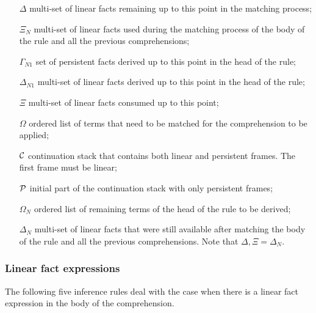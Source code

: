\begin{enumerate}

   \item[$\Delta$] multi-set of linear facts remaining up to this point in the
   matching process;

   \item[$\Xi_N$] multi-set of linear facts used during the matching process of
   the body of the rule and all the previous comprehensions;

   \item[$\Gamma_{N1}$] set of persistent facts derived up to this point in the
   head of the rule;

   \item[$\Delta_{N1}$] multi-set of linear facts derived up to this point in
   the head of the rule;

   \item[$\Xi$] multi-set of linear facts consumed up to this point;

   \item[$\Omega$] ordered list of terms that need to be matched for the
   comprehension to be applied;

   \item[$\mathcal{C}$] continuation stack that contains both linear and
   persistent frames. The first frame must be linear;

   \item[$\mathcal{P}$] initial part of the continuation stack with only persistent
   frames;

   \item[$\Omega_N$] ordered list of remaining terms of the head of the rule to
   be derived;

   \item[$\Delta_N$] multi-set of linear facts that were still available after
   matching the body of the rule and all the previous comprehensions. Note that
   $\Delta, \Xi = \Delta_N$.

\end{enumerate}

\subsubsection{Linear fact expressions}

The following five inference rules deal with the case when there is a linear
fact expression in the body of the comprehension.



